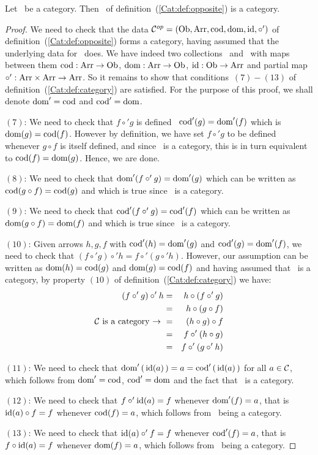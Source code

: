 \begin{prop}\label{Cat:prop:opp:is:category}
    Let \Cat\ be a category. Then \Cop\ of 
    definition~(\ref{Cat:def:opposite}) is a category.
\end{prop}
\begin{proof}
    We need to check that the data $\mbox{${\cal C}^{op}$}=(\mbox{\rm Ob}, \mbox{\rm Arr}, \mbox{\rm cod}, \mbox{\rm dom}, \mbox{\rm id}, \circ')$ 
    of definition~(\ref{Cat:def:opposite}) forms a category, having assumed
    that the underlying data for \Cat\ does. We have indeed two collections 
    \ob\ and \arr\ with maps between them $\mbox{\rm cod}:\mbox{\rm Arr}\to\mbox{\rm Ob}$, $\mbox{\rm dom}:\mbox{\rm Arr}\to\mbox{\rm Ob}$, 
    $\mbox{\rm id}:\mbox{\rm Ob}\to\mbox{\rm Arr}$ and partial map $\circ':\mbox{\rm Arr}\times\mbox{\rm Arr}\to\mbox{\rm Arr}$. So it
    remains to show that conditions~$(7)-(13)$ of 
    definition~(\ref{Cat:def:category}) are satisfied. For the purpose of
    this proof, we shall denote $\mbox{\rm dom}'=\mbox{\rm cod}$ and $\mbox{\rm cod}'=\mbox{\rm dom}$.

    $(7)$: We need to check that $f\circ' g$ is defined \ifand\ 
    $\mbox{\rm cod}'(g)=\mbox{\rm dom}'(f)$ which is $\mbox{\rm dom}(g)=\mbox{\rm cod}(f)$. However by definition, 
    we have set $f\circ' g$ to be defined whenever $g\circ f$ is itself 
    defined, and since \Cat\ is a category, this is in turn equivalent 
    to $\mbox{\rm cod}(f)=\mbox{\rm dom}(g)$. Hence, we are done.

    $(8)$: We need to check that $\mbox{\rm dom}'(f\circ' g)=\mbox{\rm dom}'(g)$ which can be
    written as $\mbox{\rm cod}(g\circ f)=\mbox{\rm cod}(g)$ and which is true since \Cat\ is a
    category.


    $(9)$: We need to check that $\mbox{\rm cod}'(f\circ' g)=\mbox{\rm cod}'(f)$ which can be
    written as $\mbox{\rm dom}(g\circ f)=\mbox{\rm dom}(f)$ and which is true since \Cat\ is a
    category.

    $(10)$: Given arrows $h,g,f$ with $\mbox{\rm cod}'(h)=\mbox{\rm dom}'(g)$ and $\mbox{\rm cod}'(g)=
    \mbox{\rm dom}'(f)$, we need to check that $(f\circ' g)\circ' h= f\circ'(g\circ' h)$.
    However, our assumption can be written as $\mbox{\rm dom}(h)=\mbox{\rm cod}(g)$ and
    $\mbox{\rm dom}(g)=\mbox{\rm cod}(f)$ and having assumed that \Cat\ is a category, by
    property $(10)$ of definition~(\ref{Cat:def:category}) we have:
        \begin{eqnarray*}(f\circ' g)\circ' h 
            &=&h\circ(f\circ' g)\\
            &=&h\circ(g\circ f)\\
            \mbox{\mbox{$\cal C$}\ is a category\ $\to$\ }
            &=&(h\circ g)\circ f\\
            &=&f\circ' (h\circ g)\\
            &=&f\circ' (g\circ' h)
        \end{eqnarray*}

    $(11)$: We need to check that $\mbox{\rm dom}'\,(\,\mbox{\rm id}(a)\,) = a = \mbox{\rm cod}'
    \,(\,\mbox{\rm id}(a)\,)$ for all $a\in\mbox{$\cal C$}$, which follows from $\mbox{\rm dom}'=\mbox{\rm cod}$,
    $\mbox{\rm cod}'=\mbox{\rm dom}$ and the fact that \Cat\ is a category.

    $(12)$: We need to check that $f\circ'\mbox{\rm id}(a)=f$ whenever $\mbox{\rm dom}'(f)=a$,
    that is $\mbox{\rm id}(a)\circ f=f$ whenever $\mbox{\rm cod}(f)=a$, which follows from
    \Cat\ being a category.

    $(13)$: We need to check that $\mbox{\rm id}(a)\circ' f=f$ whenever $\mbox{\rm cod}'(f)=a$,
    that is $f\circ\mbox{\rm id}(a)=f$ whenever $\mbox{\rm dom}(f)=a$, which follows from
    \Cat\ being a category.
\end{proof}

